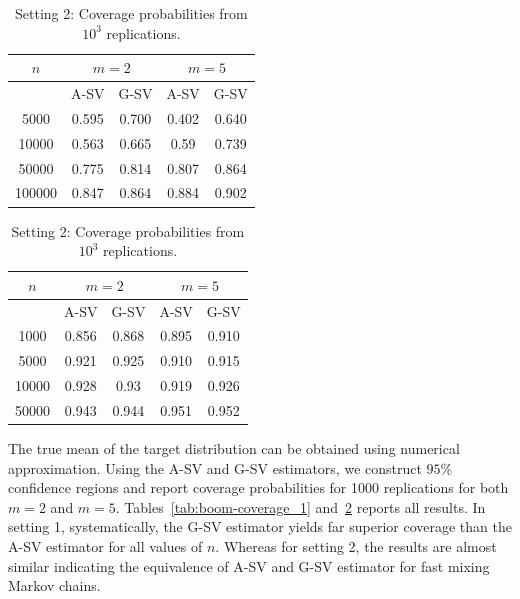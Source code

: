 \documentclass[11pt]{article}
\theoremstyle{remark}
\begin{document}
\begin{table}[htbp]
\parbox{.45\linewidth}{
\centering
\small
\begin{tabular}{|c|c|c|c|c|}
\hline
 $n$ & \multicolumn{2}{|c|}{$m = 2$} & \multicolumn{2}{|c|}{$m=5$}\\
 \hline
 & A-SV & G-SV & A-SV & G-SV \\
 \hline
 5000 & 0.595 &  0.700 & 0.402 &  0.640\\
 10000 & 0.563 &  0.665 & 0.59 &  0.739\\
 50000 & 0.775 &  0.814 & 0.807 &  0.864\\
 100000 & 0.847 &  0.864 & 0.884 &  0.902\\
\hline
\end{tabular}
\caption{Setting 1: Coverage probabilities from $10^3$ replications.}
\label{tab:boom-coverage_1}
}
\hfill
\parbox{.45\linewidth}{
\centering
\small
\begin{tabular}{|c|c|c|c|c|}
 \hline
 $n$ & \multicolumn{2}{|c|}{$m = 2$} & \multicolumn{2}{|c|}{$m=5$}\\
 \hline
 & A-SV & G-SV & A-SV & G-SV \\
 \hline
 1000 &  0.856 &  0.868 & 0.895 &  0.910\\
 5000 & 0.921 &  0.925 & 0.910 &  0.915\\
 10000 & 0.928 &  0.93 & 0.919 &  0.926\\
 50000 & 0.943 &  0.944 & 0.951 &  0.952\\
\hline
\end{tabular}
\caption{Setting 2: Coverage probabilities from $10^3$ replications.}
\label{tab:boom-coverage_2}
}
\end{table}

The true mean of the target distribution can be obtained using numerical approximation. Using  the A-SV and G-SV estimators, we construct $95\%$ confidence regions and report coverage probabilities for 1000 replications for both $m=2$ and $m=5$. Tables~\ref{tab:boom-coverage_1} and~\ref{tab:boom-coverage_2} reports all  results. In setting 1, systematically, the G-SV estimator yields far superior coverage than the A-SV estimator for all values of $n$. Whereas for setting 2, the results are almost similar indicating the equivalence of A-SV and G-SV estimator for fast mixing Markov chains.
\end{document}
